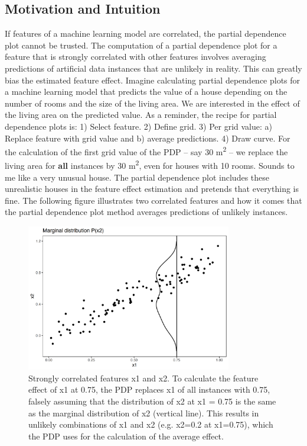\documentclass[
  11pt,
]{scrbook}
\begin{document}
\hypertarget{motivation-and-intuition}{%
\subsection{Motivation and Intuition}\label{motivation-and-intuition}}

If features of a machine learning model are correlated, the partial dependence plot cannot be trusted.
The computation of a partial dependence plot for a feature that is strongly correlated with other features involves averaging predictions of artificial data instances that are unlikely in reality.
This can greatly bias the estimated feature effect.
Imagine calculating partial dependence plots for a machine learning model that predicts the value of a house depending on the number of rooms and the size of the living area.
We are interested in the effect of the living area on the predicted value.
As a reminder, the recipe for partial dependence plots is: 1) Select feature. 2) Define grid. 3) Per grid value: a) Replace feature with grid value and b) average predictions. 4) Draw curve.
For the calculation of the first grid value of the PDP -- say 30 m\textsuperscript{2} -- we replace the living area for \textbf{all} instances by 30 m\textsuperscript{2}, even for houses with 10 rooms.
Sounds to me like a very unusual house.
The partial dependence plot includes these unrealistic houses in the feature effect estimation and pretends that everything is fine.
The following figure illustrates two correlated features and how it comes that the partial dependence plot method averages predictions of unlikely instances.

\begin{figure}

{\centering \includegraphics[width=0.8\textwidth]{images/aleplot-motivation1-1} 

}

\caption{Strongly correlated features x1 and x2. To calculate the feature effect of x1 at 0.75, the PDP replaces x1 of all instances with 0.75, falsely assuming that the distribution of x2 at x1 = 0.75 is the same as the marginal distribution of x2 (vertical line). This results in unlikely combinations of x1 and x2 (e.g. x2=0.2 at x1=0.75), which the PDP uses for the calculation of the average effect.}\label{fig:aleplot-motivation1}
\end{figure}
\end{document}
